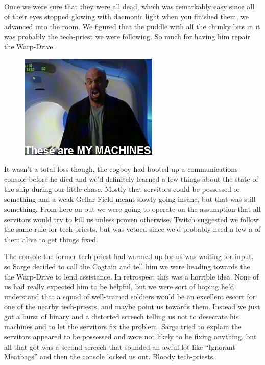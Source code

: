 Once we were sure that they were all dead, which was remarkably easy since all of their eyes stopped glowing with daemonic light when you finished them, we advanced into the room. 
We figured that the puddle with all the chunky bits in it was probably the tech-priest we were following. 
So much for having him repair the Warp-Drive.

\begin{figure}
	\begin{center}
		\includegraphics[width=\figwidth]{pics/7/23.png}
	\end{center}
\end{figure}
It wasn’t a total loss though, the cogboy had booted up a communications console before he died and we’d definitely learned a few things about the state of the ship during our little chase. 
Mostly that servitors could be possessed or something and a weak Gellar Field meant slowly going insane, but that was still something. 
From here on out we were going to operate on the assumption that all servitors would try to kill us unless proven otherwise. 
Twitch suggested we follow the same rule for tech-priests, but was vetoed since we’d probably need a few a of them alive to get things fixed.

The console the former tech-priest had warmed up for us was waiting for input, so Sarge decided to call the Cogtain and tell him we were heading towards the the Warp-Drive to lend assistance. 
In retrospect this was a horrible idea. 
None of us had really expected him to be helpful, but we were sort of hoping he’d understand that a squad of well-trained soldiers would be an excellent escort for one of the nearby tech-priests, and maybe point us towards them. 
Instead we just got a burst of binary and a distorted screech telling us not to desecrate his machines and to let the servitors fix the problem. 
Sarge tried to explain the servitors appeared to be possessed and were not likely to be fixing anything, but all that got was a second screech that sounded an awful lot like “Ignorant Meatbags” and then the console locked us out. 
Bloody tech-priests.

